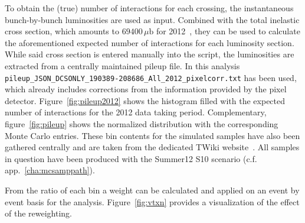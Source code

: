 To obtain the (true) number of interactions for each crossing, the instantaneous bunch-by-bunch luminosities are used as input. Combined with the total inelastic cross section, which amounts to $69400\,\mu\text{b}$ for 2012~\cite{pileup}, they can be used to calculate the aforementioned expected number of interactions for each luminosity section. While said cross section is entered manually into the script, the luminosities are extracted from a centrally maintained pileup file. In this analysis \verb+pileup_JSON_DCSONLY_190389-208686_All_2012_pixelcorr.txt+ has been used, which already includes corrections from the information provided by the pixel detector. Figure~\ref{fig:pileup2012} shows the histogram filled with the expected number of interactions for the 2012 data taking period. Complementary, figure~\ref{fig:pileup} shows the normalized distribution with the corresponding Monte Carlo entries. These bin contents for the simulated samples have also been gathered centrally and are taken from the dedicated TWiki website~\cite{pileupmc}. All samples in question have been produced with the Summer12 S10 scenario (c.f. app.~\ref{cha:mcsamppath}).

From the ratio of each bin a weight can be calculated and applied on an event by event basis for the analysis. Figure~\ref{fig:vtxn} provides a visualization of the effect of the reweighting.

